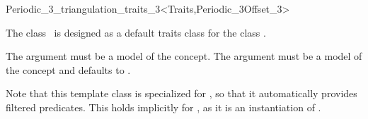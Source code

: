 

\begin{ccRefClass}{Periodic_3_triangulation_traits_3<Traits,Periodic_3Offset_3>}  %


\ccDefinition
  
The class \ccRefName\ is designed as a default traits class for the
class . 

The argument  must be a model of the
 concept. The 
argument  must be a model of the concept
 and defaults to .

Note that this template class is specialized for
, so that it automatically provides
filtered predicates. This holds implicitly for
, as it is an
instantiation of .


\ccIsModel
{}




\end{ccRefClass}
